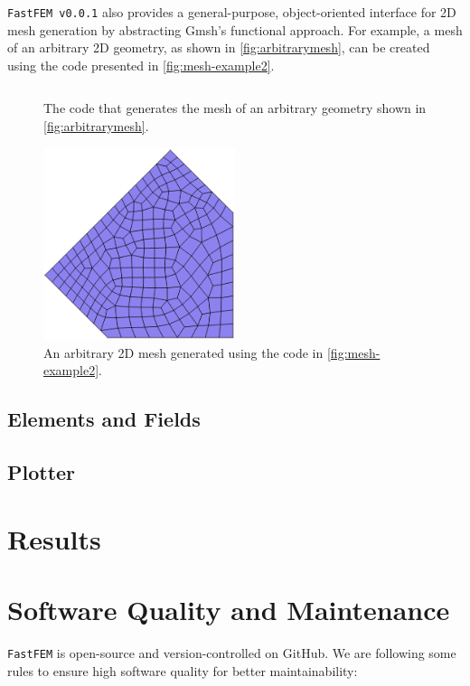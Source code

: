 \documentclass[headings=standardclasses, abstract=true]{scrartcl}
\newcommand{\pythonCodeBlock}[3]{%
    \begin{figure}
        \centering
        \begin{pythonbox}
            \inputminted[fontfamily=VSCode, fontsize=\scriptsize]{python}{#1}
        \end{pythonbox}
        \caption{#2}
        \label{#3}
    \end{figure}
}
\begin{document}
\texttt{FastFEM v0.0.1} also provides a general-purpose, object-oriented interface for 2D mesh generation by abstracting Gmsh's functional approach. For example, a mesh of an arbitrary 2D geometry, as shown in \autoref{fig:arbitrarymesh}, can be created using the code presented in \autoref{fig:mesh-example2}.

\pythonCodeBlock{figures/mesher-example2.py}{The code that generates the mesh of an arbitrary geometry shown in \autoref{fig:arbitrarymesh}.}{fig:mesh-example2}

\begin{figure}
    \centering
    \includegraphics[width=0.5\textwidth]{figures/arbitrary_mesh.png}
    \caption{An arbitrary 2D mesh generated using the code in \autoref{fig:mesh-example2}.}
    \label{fig:arbitrarymesh}
\end{figure}

\subsection{Elements and Fields}

\subsection{Plotter}

\section{Results}

\section{Software Quality and Maintenance}

\texttt{FastFEM} is open-source and version-controlled on GitHub\supercite{fastfem}. We are following some rules to ensure high software quality for better maintainability:
\end{document}
